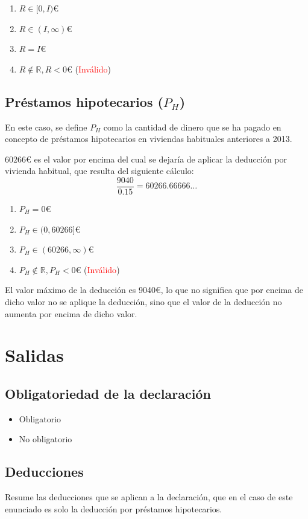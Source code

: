 \begin{enumerate}
	\item $R \in [0, I)$€
	\item $R \in (I, \infty)$€
	\item $R = I$€
	\item $R \notin \mathbb{R}, R < 0$€ (\textcolor{red}{Inválido})
\end{enumerate}

\subsection{Préstamos hipotecarios ($P_{H}$)}
En este caso, se define $P_{H}$ como la cantidad de dinero que se ha pagado
en concepto de préstamos hipotecarios en viviendas habituales anteriores a 2013.

$60266$€ es el valor por encima del cual se dejaría de aplicar la deducción por vivienda habitual,
que resulta del siguiente cálculo: $$\frac{9040}{0.15} = 60266.66666\dots$$

\begin{enumerate}
	\item $P_{H} = 0$€
	\item $P_{H} \in (0, 60266]$€
	\item $P_{H} \in (60266, \infty)$€
	\item $P_{H} \notin \mathbb{R}, P_{H} < 0$€ (\textcolor{red}{Inválido})
\end{enumerate}

\begin{notebox}
	El valor máximo de la deducción es 9040€, lo que no significa que por encima de dicho valor no se aplique
	la deducción, sino que el valor de la deducción no aumenta por encima de dicho valor.
\end{notebox}

\newpage{}
\section{Salidas}
\subsection{Obligatoriedad de la declaración}
\begin{itemize}
	\item Obligatorio
	\item No obligatorio
\end{itemize}

\subsection{Deducciones}
Resume las deducciones que se aplican a la declaración, que en el caso de este enunciado
es solo la deducción por préstamos hipotecarios.

